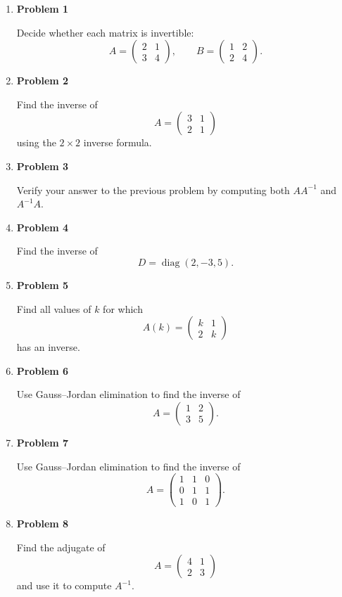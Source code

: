 \begin{enumerate}
\item \textbf{Problem 1}\par
Decide whether each matrix is invertible:
\[
A=\begin{pmatrix}2&1\\3&4\end{pmatrix},
\qquad
B=\begin{pmatrix}1&2\\2&4\end{pmatrix}.
\]

\item \textbf{Problem 2}\par
Find the inverse of
\[
A=\begin{pmatrix}3&1\\2&1\end{pmatrix}
\]
using the \(2\times2\) inverse formula.

\item \textbf{Problem 3}\par
Verify your answer to the previous problem by computing both \(AA^{-1}\) and \(A^{-1}A\).

\item \textbf{Problem 4}\par
Find the inverse of
\[
D=\operatorname{diag}(2,-3,5).
\]

\item \textbf{Problem 5}\par
Find all values of \(k\) for which
\[
A(k)=\begin{pmatrix}
k&1\\
2&k
\end{pmatrix}
\]
has an inverse.

\item \textbf{Problem 6}\par
Use Gauss--Jordan elimination to find the inverse of
\[
A=\begin{pmatrix}
1&2\\
3&5
\end{pmatrix}.
\]

\item \textbf{Problem 7}\par
Use Gauss--Jordan elimination to find the inverse of
\[
A=\begin{pmatrix}
1&1&0\\
0&1&1\\
1&0&1
\end{pmatrix}.
\]

\item \textbf{Problem 8}\par
Find the adjugate of
\[
A=\begin{pmatrix}
4&1\\
2&3
\end{pmatrix}
\]
and use it to compute \(A^{-1}\).


\end{enumerate}
